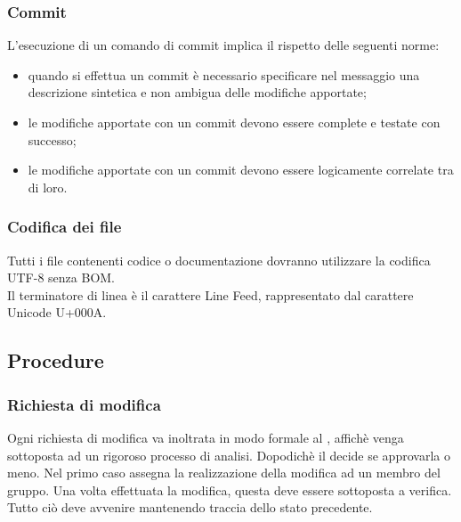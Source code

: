 			\subsubsection{Commit}
				L'esecuzione di un comando di commit implica il rispetto delle seguenti norme:
				\begin{itemize}
					\item quando si effettua un commit è necessario specificare nel messaggio una descrizione sintetica e non ambigua delle modifiche apportate;
					\item le modifiche apportate con un commit devono essere complete e testate con successo;
					\item le modifiche apportate con un commit devono essere logicamente correlate tra di loro.
				\end{itemize}
		\subsubsection{Codifica dei file}
			Tutti i file contenenti codice o documentazione dovranno utilizzare la codifica UTF-8 senza BOM.\\
			Il terminatore di linea è il carattere Line Feed, rappresentato dal carattere Unicode U+000A.
	
	\subsection{Procedure}
		\subsubsection{Richiesta di modifica}
		Ogni richiesta di modifica va inoltrata in modo formale al , affichè venga sottoposta ad un rigoroso processo di analisi. Dopodichè il  decide se approvarla o meno. Nel primo caso assegna la realizzazione della modifica ad un membro del gruppo. Una volta effettuata la modifica, questa deve essere sottoposta a verifica. Tutto ciò deve avvenire mantenendo traccia dello stato precedente.
		
